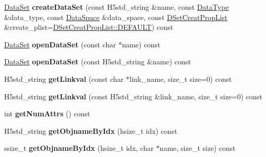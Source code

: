 \begin{DoxyCompactItemize}
\item 
\mbox{\label{class_h5_1_1_h5_location_abda4ad5d97a0cfff2779a2b4a81096db}} 
\hyperlink{class_h5_1_1_data_set}{Data\+Set} {\bfseries create\+Data\+Set} (const H5std\+\_\+string \&name, const \hyperlink{class_h5_1_1_data_type}{Data\+Type} \&data\+\_\+type, const \hyperlink{class_h5_1_1_data_space}{Data\+Space} \&data\+\_\+space, const \hyperlink{class_h5_1_1_d_set_creat_prop_list}{D\+Set\+Creat\+Prop\+List} \&create\+\_\+plist=\hyperlink{class_h5_1_1_d_set_creat_prop_list_aea0be1dc39378736daeac7af787bbc8e}{D\+Set\+Creat\+Prop\+List\+::\+D\+E\+F\+A\+U\+LT}) const
\item 
\mbox{\label{class_h5_1_1_h5_location_a1d2fc7476ad72c6a46ebe6e3e15bb1f4}} 
\hyperlink{class_h5_1_1_data_set}{Data\+Set} {\bfseries open\+Data\+Set} (const char $\ast$name) const
\item 
\mbox{\label{class_h5_1_1_h5_location_a1cb173807c0ce023a474c78cecf7dfc1}} 
\hyperlink{class_h5_1_1_data_set}{Data\+Set} {\bfseries open\+Data\+Set} (const H5std\+\_\+string \&name) const
\item 
\mbox{\label{class_h5_1_1_h5_location_a1b51a660dae019dbffa909cb44a127ca}} 
H5std\+\_\+string {\bfseries get\+Linkval} (const char $\ast$link\+\_\+name, size\+\_\+t size=0) const
\item 
\mbox{\label{class_h5_1_1_h5_location_af9d3ed7cbfddaaf0b642f792c556044e}} 
H5std\+\_\+string {\bfseries get\+Linkval} (const H5std\+\_\+string \&link\+\_\+name, size\+\_\+t size=0) const
\item 
\mbox{\label{class_h5_1_1_h5_location_a7259cdf53d511a4d6bcca4bd135b9372}} 
int {\bfseries get\+Num\+Attrs} () const
\item 
\mbox{\label{class_h5_1_1_h5_location_a6da3b0f98dda25eb4523f1cf1091c41b}} 
H5std\+\_\+string {\bfseries get\+Objname\+By\+Idx} (hsize\+\_\+t idx) const
\item 
\mbox{\label{class_h5_1_1_h5_location_a3be80465b52a3101faa247d5613882f7}} 
ssize\+\_\+t {\bfseries get\+Objname\+By\+Idx} (hsize\+\_\+t idx, char $\ast$name, size\+\_\+t size) const

\end{DoxyCompactItemize}
